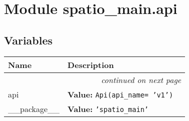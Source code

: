 %
%
%


\section{Module spatio\_main.api}

    \label{spatio_main:api}


  \subsection{Variables}

    \vspace{-1cm}
\hspace{\varindent}\begin{longtable}{|p{\varnamewidth}|p{\vardescrwidth}|l}
\cline{1-2}
\cline{1-2} \centering \textbf{Name} & \centering \textbf{Description}& \\
\cline{1-2}
\endhead\cline{1-2}\multicolumn{3}{r}{\small\textit{continued on next page}}\\\endfoot\cline{1-2}
\endlastfoot\raggedright a\-p\-i\- & \raggedright \textbf{Value:} 
{\tt Api(api\_name= 'v1')}&\\
\cline{1-2}
\raggedright \_\-\_\-p\-a\-c\-k\-a\-g\-e\-\_\-\_\- & \raggedright \textbf{Value:} 
{\tt \texttt{'}\texttt{spatio\_main}\texttt{'}}&\\
\cline{1-2}
\end{longtable}



